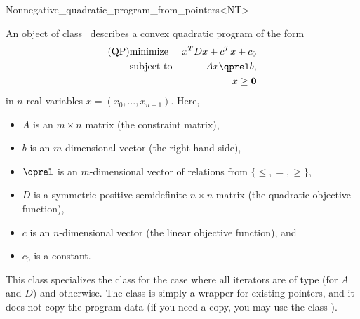 \begin{ccRefClass}{Nonnegative_quadratic_program_from_pointers<NT>}


\ccDefinition
An object of class \ccRefName\ describes a convex quadratic program of the form
\begin{eqnarray*}
\mbox{(QP)}& \mbox{minimize} & x^{T}Dx+c^{T}x+c_0 \\
&\mbox{subject to}   & Ax\qprel b, \\
&                    & x \geq \mathbf{0}
\end{eqnarray*}
in $n$ real variables $x=(x_0,\ldots,x_{n-1})$.
Here, 
\begin{itemize}
\item $A$ is an $m\times n$ matrix (the constraint matrix), 
\item $b$ is an $m$-dimensional vector (the right-hand side),
\item $\qprel$ is an $m$-dimensional vector of relations 
from $\{\leq, =, \geq\}$, 
\item $D$ is a symmetric positive-semidefinite $n\times n$ matrix (the
  quadratic objective function),
\item $c$ is an $n$-dimensional vector (the linear objective
  function), and 
\item $c_0$ is a constant.
\end{itemize}

This class specializes the class
 for the case where all iterators are of type  (for
$A$ and $D$) and  otherwise. The class is simply a wrapper for 
existing pointers, and it does not copy the program data (if you need
a copy, you may use the class ).

\ccIsModel
{}

\ccSeeAlso
{}\\

\end{ccRefClass}
